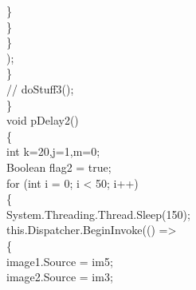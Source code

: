 {{                        \}\\

                    \}\\
                \}\\);\\
            \}\\
        //    doStuff3();\\
        \}\\
        void pDelay2()\\
        \{\\
            int k=20,j=1,m=0;\\
             Boolean flag2 = true;\\
            for (int i = 0; i < 50; i++)\\
            \{\\
                System.Threading.Thread.Sleep(150);\\

                this.Dispatcher.BeginInvoke(() =>\\
                \{\\
                    image1.Source = im5;\\
                    image2.Source = im3;\\
                   
}}
